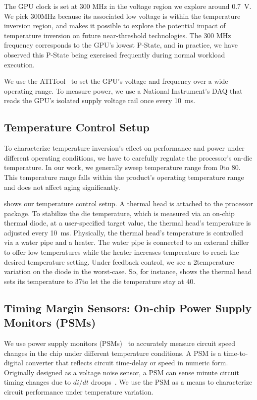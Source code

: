 The GPU clock is set at 300 MHz in the voltage region we explore around 0.7~V. We pick 300MHz because its associated low voltage is within the temperature inversion region, and makes it possible to explore the potential impact of temperature inversion on future near-threshold technologies. The 300 MHz frequency corresponds to the GPU's lowest P-State, and in practice, we have observed this P-State being exercised frequently during normal workload execution. 

We use the ATITool~\cite{atitool} to set the GPU's voltage and frequency over a wide operating range. To measure power, we use a National Instrument's DAQ that reads the GPU's isolated supply voltage rail once every 10~ms.

\subsection{Temperature Control Setup}
\label{sec:temperature:setup:temp}

To characterize temperature inversion's effect on performance and power under different operating conditions, we have to carefully regulate the processor's on-die temperature. In our work, we generally sweep temperature range from 0\C to 80\C. This temperature range falls within the product's operating temperature range and does not affect aging significantly.

 shows our temperature control setup. A thermal head is attached to the processor package. To stabilize the die temperature, which is measured via an on-chip thermal diode, at a user-specified target value, the thermal head's temperature is adjusted every 10~ms. Physically, the thermal head's temperature is controlled via a water pipe and a heater. The water pipe is connected to an external chiller to offer low temperatures while the heater increases temperature to reach the desired temperature setting. Under feedback control, we see a 2\C temperature variation on the diode in the worst-case. So, for instance,  shows the thermal head sets its temperature to 37\C to let the die temperature stay at 40\C. 

\subsection{Timing Margin Sensors: On-chip Power Supply Monitors (PSMs)}
\label{sec:temperature:setup:psm}

We use power supply monitors (PSMs)~\cite{grenat20145,gillespie2014streamroller} to accurately measure circuit speed changes in the chip under different temperature conditions. A PSM is a time-to-digital converter that reflects circuit time-delay or speed in numeric form. Originally designed as a voltage noise sensor, a PSM can sense minute circuit timing changes due to $di/dt$ droops~\cite{grenat20145}. We use the PSM as a means to characterize circuit performance under temperature variation.

